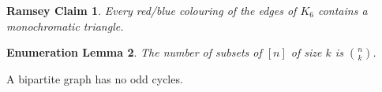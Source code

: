 \documentclass{article}
\newtheorem{ramseyclaim}{Ramsey Claim}
\newtheorem{enumlemma}[ramseyclaim]{Enumeration Lemma}
\begin{document}
\begin{ramseyclaim}
Every red/blue colouring of the edges of $K_6$ contains a monochromatic triangle.
\end{ramseyclaim}

\begin{enumlemma}
The number of subsets of $[n]$ of size $k$ is $\binom{n}{k}$.
\end{enumlemma}

\begin{theorem}
A bipartite graph has no odd cycles.
\end{theorem}
\end{document}
